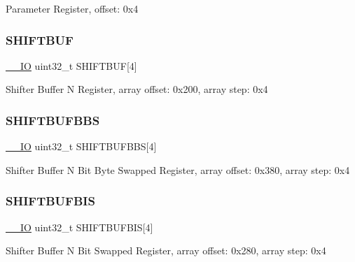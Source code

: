 Parameter Register, offset\+: 0x4 \mbox{\label{struct_f_l_e_x_i_o___type_aa6245ede1b2d4972e424882a6bac9aca}} 
\subsubsection{\texorpdfstring{SHIFTBUF}{SHIFTBUF}}
{\footnotesize\ttfamily \mbox{\hyperlink{core__cm0plus_8h_aec43007d9998a0a0e01faede4133d6be}{\+\_\+\+\_\+\+IO}} uint32\+\_\+t S\+H\+I\+F\+T\+B\+UF\mbox{[}4\mbox{]}}

Shifter Buffer N Register, array offset\+: 0x200, array step\+: 0x4 \mbox{\label{struct_f_l_e_x_i_o___type_a20a7ae70a83e2537599822f4e39b7ad2}} 
\subsubsection{\texorpdfstring{SHIFTBUFBBS}{SHIFTBUFBBS}}
{\footnotesize\ttfamily \mbox{\hyperlink{core__cm0plus_8h_aec43007d9998a0a0e01faede4133d6be}{\+\_\+\+\_\+\+IO}} uint32\+\_\+t S\+H\+I\+F\+T\+B\+U\+F\+B\+BS\mbox{[}4\mbox{]}}

Shifter Buffer N Bit Byte Swapped Register, array offset\+: 0x380, array step\+: 0x4 \mbox{\label{struct_f_l_e_x_i_o___type_aae8f83438455dd7ab0fe455435e3cbd0}} 
\subsubsection{\texorpdfstring{SHIFTBUFBIS}{SHIFTBUFBIS}}
{\footnotesize\ttfamily \mbox{\hyperlink{core__cm0plus_8h_aec43007d9998a0a0e01faede4133d6be}{\+\_\+\+\_\+\+IO}} uint32\+\_\+t S\+H\+I\+F\+T\+B\+U\+F\+B\+IS\mbox{[}4\mbox{]}}

Shifter Buffer N Bit Swapped Register, array offset\+: 0x280, array step\+: 0x4 \mbox{\label{struct_f_l_e_x_i_o___type_a58d945a6041081c95711f00929d08269}} 
